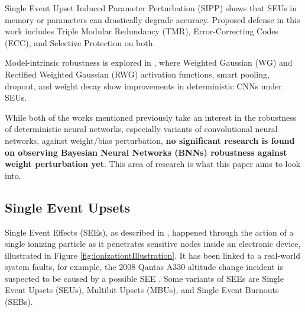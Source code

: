 Single Event Upset Induced Parameter Perturbation (SIPP) \cite{yan_2020a} shows that SEUs in memory or parameters can drastically degrade accuracy. Proposed defense in this work includes Triple Modular Redundancy (TMR), Error-Correcting Codes (ECC), and Selective Protection on both.


Model-intrinsic robustness is explored in \cite{dennispoperobustcnn}, where Weighted Gaussian (WG) and Rectified Weighted Gaussian (RWG) activation functions, smart pooling, dropout, and weight decay show improvements in deterministic CNNs under SEUs.

While both of the works mentioned previously take an interest in the robustness of deterministic neural networks, especially variants of convolutional neural networks, against weight/bias perturbation, \textbf{no significant research is found on observing Bayesian Neural Networks (BNNs) robustness against weight perturbation yet}. This area of research is what this paper aims to look into.

\subsection{Single Event Upsets}
\noindent

Single Event Effects (SEEs), as described in \cite{petersen_single_2011}, happened through the action of a single ionizing particle as it penetrates sensitive nodes inside an electronic device, illustrated in Figure \ref{fig:ionizationtIllustration}. It has been linked to a real-world system faults, for example, the 2008 Qantas A330 altitude change incident is suspected to be caused by a possible SEE \cite{ATSB2009QF72}. Some variants of SEEs are Single Event Upsets (SEUs), Multibit Upsets (MBUs), and Single Event Burnouts (SEBs).


